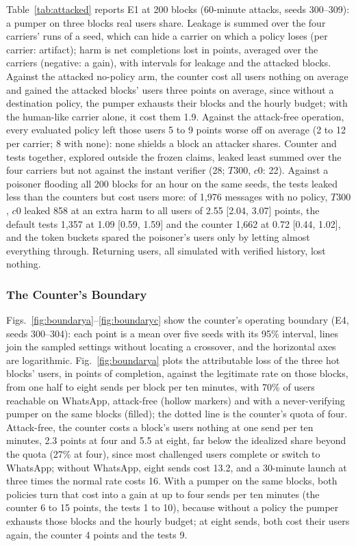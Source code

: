 \documentclass{IEEEoj}
\begin{document}
Table~\ref{tab:attacked} reports E1 at 200 blocks (60-minute attacks, seeds 300--309): a pumper on three blocks real users share. Leakage is summed over the four carriers' runs of a seed, which can hide a carrier on which a policy loses (per carrier: artifact); harm is net completions lost in points, averaged over the carriers (negative: a gain), with intervals for leakage and the attacked blocks. Against the attacked no-policy arm, the counter cost all users nothing on average and gained the attacked blocks' users three points on average, since without a destination policy, the pumper exhausts their blocks and the hourly budget; with the human-like carrier alone, it cost them 1.9. Against the attack-free operation, every evaluated policy left those users 5 to 9 points worse off on average (2 to 12 per carrier; 8 with none): none shields a block an attacker shares. Counter and tests together, explored outside the frozen claims, leaked least summed over the four carriers but not against the instant verifier (28; $T300$, $c0$: 22). Against a poisoner flooding all 200 blocks for an hour on the same seeds, the tests leaked less than the counters but cost users more: of 1,976 messages with no policy, $T300$, $c0$ leaked 858 at an extra harm to all users of 2.55 [2.04, 3.07] points, the default tests 1,357 at 1.09 [0.59, 1.59] and the counter 1,662 at 0.72 [0.44, 1.02], and the token buckets spared the poisoner's users only by letting almost everything through. Returning users, all simulated with verified history, lost nothing.


\subsubsection{The Counter's Boundary}
Figs.~\ref{fig:boundarya}--\ref{fig:boundaryc} show the counter's operating boundary (E4, seeds 300--304): each point is a mean over five seeds with its 95\% interval, lines join the sampled settings without locating a crossover, and the horizontal axes are logarithmic. Fig.~\ref{fig:boundarya} plots the attributable loss of the three hot blocks' users, in points of completion, against the legitimate rate on those blocks, from one half to eight sends per block per ten minutes, with 70\% of users reachable on WhatsApp, attack-free (hollow markers) and with a never-verifying pumper on the same blocks (filled); the dotted line is the counter's quota of four. Attack-free, the counter costs a block's users nothing at one send per ten minutes, 2.3 points at four and 5.5 at eight, far below the idealized share beyond the quota (27\% at four), since most challenged users complete or switch to WhatsApp; without WhatsApp, eight sends cost 13.2, and a 30-minute launch at three times the normal rate costs 16. With a pumper on the same blocks, both policies turn that cost into a gain at up to four sends per ten minutes (the counter 6 to 15 points, the tests 1 to 10), because without a policy the pumper exhausts those blocks and the hourly budget; at eight sends, both cost their users again, the counter 4 points and the tests 9.
\end{document}
